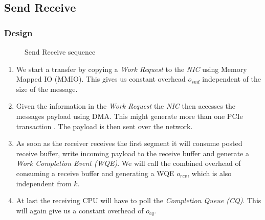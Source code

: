 \subsection{Send Receive}\label{sendrcv}
\subsubsection{Design} \label{sendrcv-design}




\begin{figure}[!ht]
\begin{center}
\end{center}
\caption{Send Receive sequence}
\label{fig:seq-sndrcv}
\end{figure}




\begin{enumerate}
  \item We start a transfer by copying a \emph{Work Request} to the \emph{NIC} using Memory Mapped IO (MMIO). This gives
    us constant overhead $o_{snd}$ independent of the size of the message.
  \item Given the information in the \emph{Work Request} the \emph{NIC} then accesses the messages payload using DMA. This 
    might generate more than one PCIe transaction \cite{atc16-kalia}. The payload is then sent over the network.
  \item As soon as the receiver receives the first segment it will consume posted receive buffer, write incoming payload 
    to the receive buffer and generate a \emph{Work Completion Event (WQE)}. We will call the combined overhead of consuming a receive
    buffer and generating a WQE $o_{rcv}$, which is also independent from $k$.
  \item At last the receiving CPU will have to poll the \emph{Completion Queue (CQ)}. This will again give us a constant 
    overhead of $o_{cq}$.
\end{enumerate}

